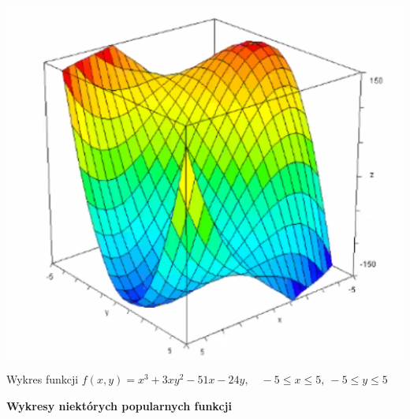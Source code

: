 \begin{center}
\includegraphics[scale=0.6]{img/wykres_wieluzm1.png}

Wykres funkcji $ f(x,y) = x^3 + 3xy^2 - 51x - 24y, \quad -5 \leq x \leq 5, \ -5 \leq y \leq 5 $
\end{center}

\textbf{Wykresy niektórych popularnych funkcji}

